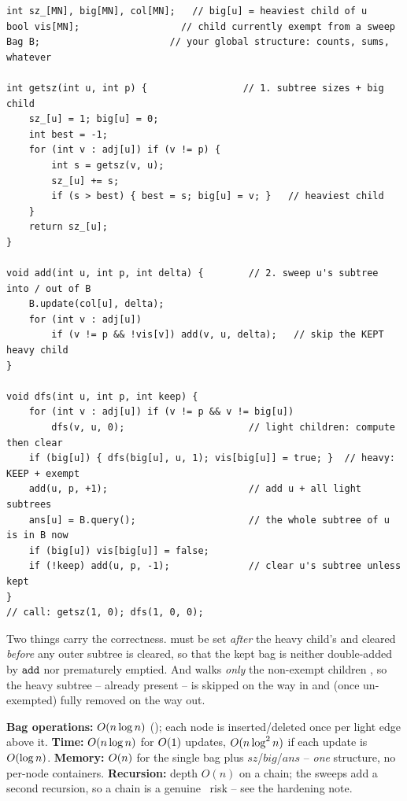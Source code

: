 \begin{lstlisting}[caption={the sack skeleton: sizes first, then the keep/big schedule}, label={lst:c28-sack}]
int sz_[MN], big[MN], col[MN];   // big[u] = heaviest child of u
bool vis[MN];                  // child currently exempt from a sweep
Bag B;                       // your global structure: counts, sums, whatever

int getsz(int u, int p) {                 // 1. subtree sizes + big child
    sz_[u] = 1; big[u] = 0;
    int best = -1;
    for (int v : adj[u]) if (v != p) {
        int s = getsz(v, u);
        sz_[u] += s;
        if (s > best) { best = s; big[u] = v; }   // heaviest child
    }
    return sz_[u];
}

void add(int u, int p, int delta) {        // 2. sweep u's subtree into / out of B
    B.update(col[u], delta);
    for (int v : adj[u])
        if (v != p && !vis[v]) add(v, u, delta);   // skip the KEPT heavy child
}

void dfs(int u, int p, int keep) {
    for (int v : adj[u]) if (v != p && v != big[u])
        dfs(v, u, 0);                      // light children: compute then clear
    if (big[u]) { dfs(big[u], u, 1); vis[big[u]] = true; }  // heavy: KEEP + exempt
    add(u, p, +1);                         // add u + all light subtrees
    ans[u] = B.query();                    // the whole subtree of u is in B now
    if (big[u]) vis[big[u]] = false;
    if (!keep) add(u, p, -1);              // clear u's subtree unless kept
}
// call: getsz(1, 0); dfs(1, 0, 0);
\end{lstlisting}

Two things carry the correctness.   must be set
\emph{after} the heavy child's  and cleared \emph{before} any outer
subtree is cleared, so that the kept bag is neither double-added by
\(\texttt{add}\) nor prematurely emptied.  And  walks \emph{only} the
non-exempt children , so the heavy subtree -- already present --
is skipped on the way in and (once un-exempted) fully removed on the way out.

\begin{complexitybox}[Sack]
\textbf{Bag operations:} \(O(n\log n)\) (); each node is
inserted/deleted once per light edge above it.  \textbf{Time:}
\(O(n\log n)\) for \(O(1)\) updates, \(O(n\log^2 n)\) if each
update is \(O(\log n)\).  \textbf{Memory:} \(O(n)\) for the single bag
plus \(sz\)/\(\mathit{big}\)/\(\mathit{ans}\) -- \emph{one} structure, no per-node
containers.  \textbf{Recursion:} depth \(O(n)\) on a chain; the sweeps add a
second recursion, so a chain is a genuine \re\ risk -- see the hardening note.
\end{complexitybox}

